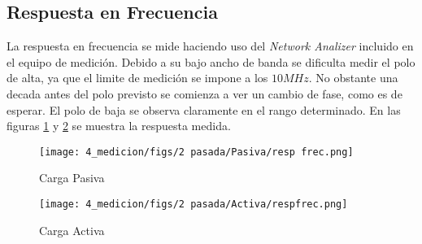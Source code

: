 \subsection{Respuesta en Frecuencia}

La respuesta en frecuencia se mide haciendo uso del \textit{Network Analizer} incluido en el equipo de medición. Debido a su bajo ancho de banda se dificulta medir el polo de alta, ya que el limite de medición se impone a los $10 MHz$. No obstante una decada antes del polo previsto se comienza a ver un cambio de fase, como es de esperar.
El polo de baja se observa claramente en el rango determinado. En las figuras \ref{fig:frec carga pasiva} y \ref{fig:frec carga activa} se muestra la respuesta medida.



\begin{figure}[ht]
    \centering
    \texttt{[image: 4\_medicion/figs/2 pasada/Pasiva/resp frec.png]}
    \caption{Carga Pasiva}
    \label{fig:frec carga pasiva}
\end{figure}

\begin{figure}[ht]
    \centering
    \texttt{[image: 4\_medicion/figs/2 pasada/Activa/respfrec.png]}
    \caption{Carga Activa}
    \label{fig:frec carga activa}
\end{figure}